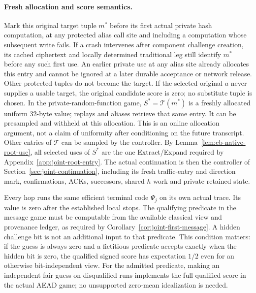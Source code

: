 \paragraph{Fresh allocation and score semantics.}
Mark this original target tuple $m^*$ before its first actual private hash
computation, at any protected alias call site and including a computation
whose subsequent write fails. If a crash intervenes after component
challenge creation, its cached ciphertext and locally determined traditional
leg still identify $m^*$ before any such first use. An earlier private use
at any alias site already allocates this entry and cannot be ignored at a
later durable acceptance or network release. Other protected tuples do not
become the target. If the selected original $a$ never supplies a usable
target, the original candidate score is zero; no substitute tuple is chosen.
In the private-random-function game,
$S^*=\mathcal T(m^*)$ is a freshly allocated uniform 32-byte value;
replays and aliases retrieve that same entry. It can be presampled and
withheld at this allocation. This is an online allocation argument,
not a claim of uniformity after conditioning on the future transcript.
Other entries of $\mathcal T$ can be sampled by the controller. By
Lemma~\ref{lem:cb-native-root-use}, all selected uses of $S^*$ are the
one Extract/Expand required by Appendix~\ref{app:joint-root-entry}.
The actual continuation is then the controller of
Section~\ref{sec:joint-continuation}, including its fresh traffic-entry
and direction mark, confirmations, ACKs, successors, shared $h$ work and
private retained state.

Every hop runs the same efficient terminal code $\Psi_j$ on its own actual
trace. Its value is zero after the established local stops. The qualifying
predicate in the message game must be computable from the available
classical view and provenance ledger, as required by
Corollary~\ref{cor:joint-first-message}. A hidden challenge bit is not an
additional input to that predicate. This condition matters: if the guess
is always zero and a fictitious predicate accepts exactly when the hidden
bit is zero, the qualified signed score has expectation $1/2$ even for an
otherwise bit-independent view. For the admitted predicate, making an
independent fair guess on disqualified runs implements the full qualified
score in the actual AEAD game; no unsupported zero-mean idealization is
needed.

